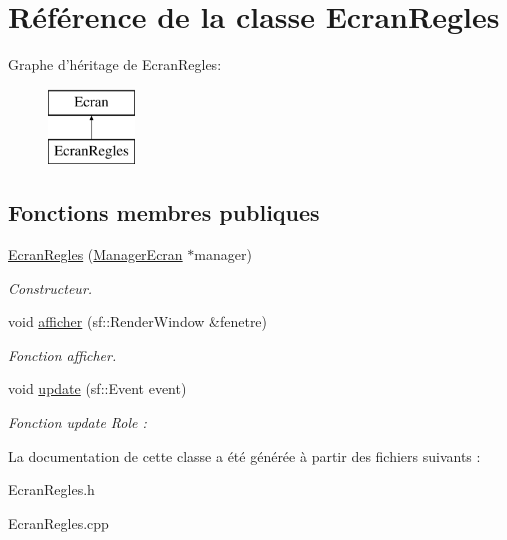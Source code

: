 \hypertarget{classEcranRegles}{\section{\-Référence de la classe \-Ecran\-Regles}
\label{classEcranRegles}
}
\-Graphe d'héritage de \-Ecran\-Regles\-:\begin{figure}[H]
\begin{center}
\leavevmode
\includegraphics[height=2.000000cm]{classEcranRegles}
\end{center}
\end{figure}
\subsection*{\-Fonctions membres publiques}
\begin{DoxyCompactItemize}
\item 
\hypertarget{classEcranRegles_af76f933a8096f76456612a610c0f9bff}{\hyperlink{classEcranRegles_af76f933a8096f76456612a610c0f9bff}{\-Ecran\-Regles} (\hyperlink{classManagerEcran}{\-Manager\-Ecran} $\ast$manager)}\label{classEcranRegles_af76f933a8096f76456612a610c0f9bff}

\begin{DoxyCompactList}\small\item\em \-Constructeur. \end{DoxyCompactList}\item 
\hypertarget{classEcranRegles_aae93ff98faa75574547434e0e9aba41d}{void \hyperlink{classEcranRegles_aae93ff98faa75574547434e0e9aba41d}{afficher} (sf\-::\-Render\-Window \&fenetre)}\label{classEcranRegles_aae93ff98faa75574547434e0e9aba41d}

\begin{DoxyCompactList}\small\item\em \-Fonction afficher. \end{DoxyCompactList}\item 
\hypertarget{classEcranRegles_ad7029efa29a7584bd9aaee5051672a97}{void \hyperlink{classEcranRegles_ad7029efa29a7584bd9aaee5051672a97}{update} (sf\-::\-Event event)}\label{classEcranRegles_ad7029efa29a7584bd9aaee5051672a97}

\begin{DoxyCompactList}\small\item\em \-Fonction update \-Role \-: \end{DoxyCompactList}\end{DoxyCompactItemize}


\-La documentation de cette classe a été générée à partir des fichiers suivants \-:\begin{DoxyCompactItemize}
\item 
\-Ecran\-Regles.\-h\item 
\-Ecran\-Regles.\-cpp\end{DoxyCompactItemize}
